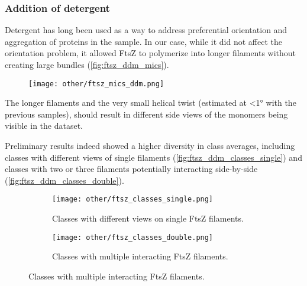 \subsubsection{Addition of detergent}
Detergent has long been used as a way to address preferential orientation and aggregation of proteins in the sample.
In our case, while it did not affect the orientation problem, it allowed FtsZ to polymerize into longer filaments without creating large bundles (\autoref{fig:ftsz_ddm_mics}).

\begin{figure}
    \centering
    \texttt{[image: other/ftsz\_mics\_ddm.png]}
    \label{fig:ftsz_ddm_mics}
\end{figure}

The longer filaments and the very small helical twist (estimated at <1° with the previous samples), should result in different side views of the monomers being visible in the dataset.

Preliminary results indeed showed a higher diversity in class averages, including classes with different views of single filaments (\autoref{fig:ftsz_ddm_classes_single}) and classes with two or three filaments potentially interacting side-by-side (\autoref{fig:ftsz_ddm_classes_double}).

\begin{figure}
    \centering
    \begin{subfigure}[B]{.5\textwidth}
        \centering
        \texttt{[image: other/ftsz\_classes\_single.png]}
        \caption{Classes with different views on single FtsZ filaments.}
        \label{fig:ftsz_ddm_classes_single}
    \end{subfigure}%
    \hfill
    \begin{subfigure}[B]{.5\textwidth}
        \centering
        \texttt{[image: other/ftsz\_classes\_double.png]}
        \caption{Classes with multiple interacting FtsZ filaments.}
        \label{fig:ftsz_ddm_classes_double}
    \end{subfigure}%
    \label{fig:ftsz_ddm_classes}
\end{figure}

